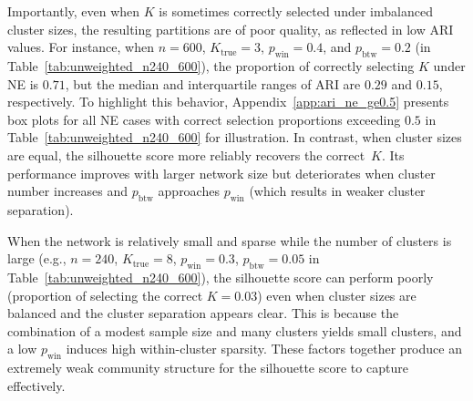\documentclass[12pt, titlepage, reqno]{article}
\begin{document}
Importantly, even when $K$ is sometimes correctly 
selected under imbalanced cluster sizes, the resulting partitions 
are of poor quality, as reflected in low ARI values. For instance, 
when $n = 600$, $K_{\text{true}} = 3$, $p_{\text{win}} = 0.4$, and 
$p_{\text{btw}} = 0.2$ (in Table~\ref{tab:unweighted_n240_600}), the 
proportion of correctly selecting $K$ under NE is $0.71$, but the 
median and interquartile ranges of ARI are $0.29$ and $0.15$, 
respectively. To highlight this behavior, 
Appendix~\ref{app:ari_ne_ge0.5} presents box plots 
for all NE cases with correct selection proportions exceeding $0.5$ 
in Table~\ref{tab:unweighted_n240_600} for illustration. In contrast, 
when cluster sizes are equal, the silhouette score more reliably 
recovers the correct~$K$. Its performance improves with larger 
network size but deteriorates when cluster number increases and 
$p_{\text{btw}}$ approaches $p_{\text{win}}$ (which results in weaker 
cluster separation). 


When the network is relatively small and sparse while 
the number of clusters is large (e.g., $n = 240$, $K_{\text{true}} = 
8$, $p_{\text{win}} = 0.3$, $p_{\text{btw}} = 0.05$ in 
Table~\ref{tab:unweighted_n240_600}), the silhouette score can 
perform poorly (proportion of selecting the correct $K = 0.03$) even 
when cluster sizes are balanced and 
the cluster separation appears clear. This is because the 
combination of a modest sample size and many clusters yields small 
clusters, and a low $p_{\text{win}}$ induces high within-cluster 
sparsity. These factors together produce an extremely weak community 
structure for the silhouette score to capture effectively.
\end{document}
